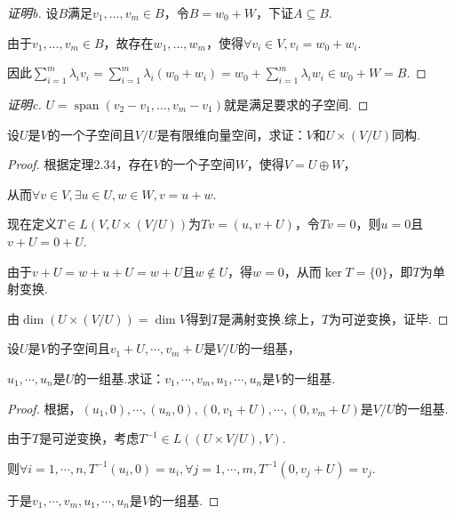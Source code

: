 \begin{proof}[证明b]
    设\(B\)满足\(v_1, \dots, v_m \in B\)，令\(B=w_0+W\)，下证\(A \subseteq B\).

    由于\(v_1, \dots, v_m \in B\)，故存在\(w_1, \dots, w_m\)，使得\(\forall v_i \in V,v_i=w_0+w_i\).

    因此\(\sum_{i=1}^m \lambda_i v_i=\sum_{i=1}^m \lambda_i(w_0+w_i)=w_0+\sum_{i=1}^m \lambda_i w_i \in w_0+W=B\).
\end{proof}

\begin{proof}[证明c]
    \(U=\operatorname{span}(v_2-v_1, \dots, v_m-v_1)\)就是满足要求的子空间.
\end{proof}

\begin{problem}[12]\label{3.E.12}
    设\(U\)是\(V\)的一个子空间且\(V/U\)是有限维向量空间，求证：\(V\)和\(U \times (V/U)\)同构.
\end{problem}

\begin{proof}
    根据定理2.34，存在\(V\)的一个子空间\(W\)，使得\(V=U \oplus W\)，

    从而\(\forall v \in V, \exists u \in U,w \in W,v=u+w\).
    
    现在定义\(T \in L(V,U \times (V/U))\)为\(Tv=(u,v+U)\)，令\(Tv=0\)，则\(u=0\)且\(v+U=0+U\).
    
    由于\(v+U=w+u+U=w+U\)且\(w \notin U\)，得\(w=0\)，从而\(\ker T=\{0\}\)，即\(T\)为单射变换.
    
    由\(\dim (U \times (V/U))=\dim V\)得到\(T\)是满射变换.综上，\(T\)为可逆变换，证毕.
\end{proof}

\begin{problem}[13]\label{3.E.13}
    设\(U\)是\(V\)的子空间且\(v_1+U,\cdots,v_m+U\)是\(V/U\)的一组基，
    
    \(u_1,\cdots,u_n\)是\(U\)的一组基.求证：\(v_1,\cdots,v_m,u_1,\cdots,u_n\)是\(V\)的一组基.
\end{problem}

\begin{proof}
    根据，\((u_1,0),\cdots,(u_n,0),(0,v_1+U),\cdots,(0,v_m+U)\)是\(V/U\)的一组基.

    由于\(T\)是可逆变换，考虑\(T^{-1} \in L((U \times V/U),V)\).

    则\(\forall i=1,\cdots,n,T^{-1}(u_i,0)=u_i,\forall j=1,\cdots,m,T^{-1}(0,v_j+U)=v_j\).

    于是\(v_1,\cdots,v_m,u_1,\cdots,u_n\)是\(V\)的一组基.
\end{proof}

